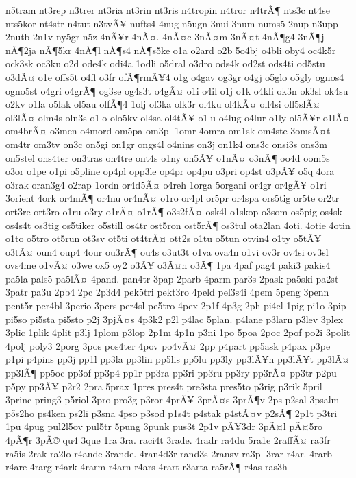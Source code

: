 {n5tram
nt3rep
n3trer
nt3ria
nt3rin
nt3ris
n4tropin
n4tror
n4trÃ¶
nts3c
nt4se
nts5kor
nt4str
n4tut
n3tvÃ¥
nufts4
4nug
n5ugn
3nui
3num
nums5
2nup
n3upp
2nutb
2n1v
ny5gr
n5z
4nÃ¥r
4nÃ¤.
4nÃ¤c
3nÃ¤m
3nÃ¤t
4nÃ¶g4
3nÃ¶j
nÃ¶2ja
nÃ¶5kr
4nÃ¶l
nÃ¶s4
nÃ¶s5ke
o1a
o2ard
o2b
5o4bj
o4bli
oby4
oc4k5r
ock3sk
oc3ku
o2d
ode4k
odi4a
1odli
o5dral
o3dro
ods4k
od2st
ods4ti
od5stu
o3dÃ¤
o1e
offs5t
o4fl
o3fr
ofÃ¶rmÃ¥4
o1g
o4gav
og3gr
o4gj
o5glo
o5gly
ognos4
ogno5st
o4gri
o4grÃ¶
og3se
og4s3t
o4gÃ¤
o1i
o4il
o1j
o1k
o4kli
ok3n
ok3sl
ok4su
o2kv
o1la
o5lak
ol5au
olfÃ¶4
1olj
ol3ka
olk3r
ol4ku
ol4kÃ¤
oll4si
oll5slÃ¤
ol3lÃ¤
olm4s
oln3s
o1lo
olo5kv
ol4sa
ol4tÃ¥
o1lu
o4lug
o4lur
o1ly
ol5Ã¥r
o1lÃ¤
om4brÃ¤
o3men
o4mord
om5pa
om3pl
1omr
4omra
om1sk
om4ste
3omsÃ¤t
om4tr
om3tv
on3c
on5gi
on1gr
ongs4l
o4nins
on3j
on1k4
ons3c
onsi3s
ons3m
on5stel
ons4ter
on3tras
on4tre
ont4s
o1ny
on5Ã¥
o1nÃ¤
o3nÃ¶
oo4d
oom5s
o3or
o1pe
o1pi
o5pline
op4pl
opp3le
op4pr
op4pu
o3pri
op4st
o3pÃ¥
o5q
4ora
o3rak
oran3g4
o2rap
1ordn
or4d5Ã¤
o4reh
1orga
5organi
or4gr
or4gÃ¥
o1ri
3orient
4ork
or4mÃ¶
or4nu
or4nÃ¤
o1ro
or4pl
or5pr
or4spa
ors5tig
or5te
or2tr
ort3re
ort3ro
o1ru
o3ry
o1rÃ¤
o1rÃ¶
o3s2fÃ¤
osk4l
o1skop
o3som
os5pig
os4sk
os4s4t
os3tig
os5tiker
o5still
os4tr
ost5ron
ost5rÃ¶
os3tul
ota2lan
4oti.
4otie
4otin
o1to
o5tro
ot5run
ot3sv
ot5ti
ot4trÃ¤
ott2s
o1tu
o5tun
otvin4
o1ty
o5tÃ¥
o3tÃ¤
oun4
oup4
4our
ou3rÃ¶
ou4s
o3ut3t
o1va
ova4n
o1vi
ov3r
ov4si
ov3sl
ovs4me
o1vÃ¤
o3we
ox5
oy2
o3Ã¥
o3Ã¤n
o3Ã¶
1pa
4paf
pag4
paki3
pakis4
pa5la
pals5
pa5lÃ¤
4pand.
pan4tr
3pap
2parb
4parm
par3s
2pask
pa5ski
pa2st
3patr
pa3u
2pb4
2pc
2p3d4
pek5tri
pekt3ro
4peld
pel3s4i
4pem
5peng
3penn
pent5r
per4bl
3perio
3pers
per4sl
pe5tro
4pex
2p1f
4p3g
2ph
pi4el
1pig
pi1o
3pip
pi5so
pi5sta
pi5sto
p2j
3pjÃ¤s
4p3k2
p2l
p4lac
5plan.
p4lane
p3larn
p3lev
3plex
3plic
1plik
4plit
p3lj
1plom
p3lop
2p1m
4p1n
p3ni
1po
5poa
2poc
2pof
po2i
3polit
4polj
poly3
2porg
3pos
pos4ter
4pov
po4vÃ¤
2pp
p4part
pp5ask
p4pax
p3pe
p1pi
p4pins
pp3j
pp1l
pp3la
pp3lin
pp5lis
pp5lu
pp3ly
pp3lÃ¥n
pp3lÃ¥t
pp3lÃ¤
pp3lÃ¶
pp5oc
pp3of
pp3p4
pp1r
pp3ra
pp3ri
pp3ru
pp3ry
pp3rÃ¤
pp3tr
p2pu
p5py
pp3Ã¥
p2r2
2pra
5prax
1pres
pres4t
pre3sta
pres5to
p3rig
p3rik
5pril
3princ
pring3
p5riol
3pro
pro3g
p3ror
4prÃ¥
3prÃ¤s
3prÃ¶v
2ps
p2sal
3psalm
p5s2ho
ps4ken
ps2li
p3sna
4pso
p3sod
p1s4t
p4stak
p4stÃ¤v
p2sÃ¶
2p1t
p3tri
1pu
4pug
pul2l5ov
pul5tr
5pung
3punk
pus3t
2p1v
pÃ¥3dr
3pÃ¤l
pÃ¤5ro
4pÃ¶r
3pÃ©
qu4
3que
1ra
3ra.
raci4t
3rade.
4radr
ra4du
5ra1e
2raffÃ¤
ra3fr
ra5is
2rak
ra2lo
r4ande
3rande.
4ran4d3r
rand3s
2ransv
ra3pl
3rar
r4ar.
4rarb
r4are
4rarg
r4ark
4rarm
r4arn
r4ars
4rart
r3arta
ra5rÃ¶
r4as
ras3h
}

